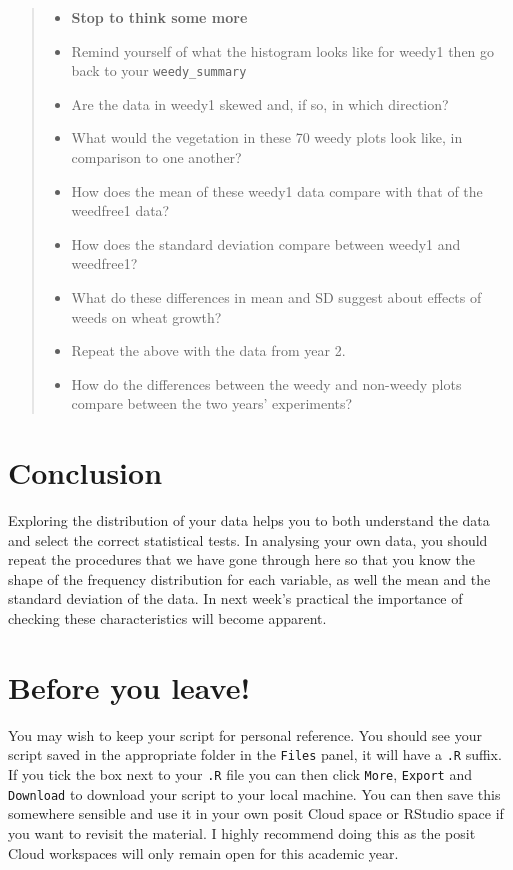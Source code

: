 \documentclass[
]{book}
\providecommand{\tightlist}{%
  \setlength{\itemsep}{0pt}\setlength{\parskip}{0pt}}
\begin{document}
\begin{quote}
\begin{itemize}
\tightlist
\item
  \textbf{Stop to think some more}
\item
  Remind yourself of what the histogram looks like for weedy1 then go back to your \texttt{weedy\_summary}
\item
  Are the data in weedy1 skewed and, if so, in which direction?
\item
  What would the vegetation in these 70 weedy plots look like, in comparison to one another?
\item
  How does the mean of these weedy1 data compare with that of the weedfree1 data?
\item
  How does the standard deviation compare between weedy1 and weedfree1?
\item
  What do these differences in mean and SD suggest about effects of weeds on wheat growth?
\item
  Repeat the above with the data from year 2.
\item
  How do the differences between the weedy and non-weedy plots compare between the two years' experiments?
\end{itemize}
\end{quote}

\section{Conclusion}\label{conclusion-1}

Exploring the distribution of your data helps you to both understand the data and select the correct statistical tests. In analysing your own data, you should repeat the procedures that we have gone through here so that you know the shape of the frequency distribution for each variable, as well the mean and the standard deviation of the data. In next week's practical the importance of checking these characteristics will become apparent.

\section{Before you leave!}\label{before-you-leave-1}

You may wish to keep your script for personal reference. You should see your script saved in the appropriate folder in the \texttt{Files} panel, it will have a \texttt{.R} suffix. If you tick the box next to your \texttt{.R} file you can then click \texttt{More}, \texttt{Export} and \texttt{Download} to download your script to your local machine. You can then save this somewhere sensible and use it in your own posit Cloud space or RStudio space if you want to revisit the material. I highly recommend doing this as the posit Cloud workspaces will only remain open for this academic year.
\end{document}

